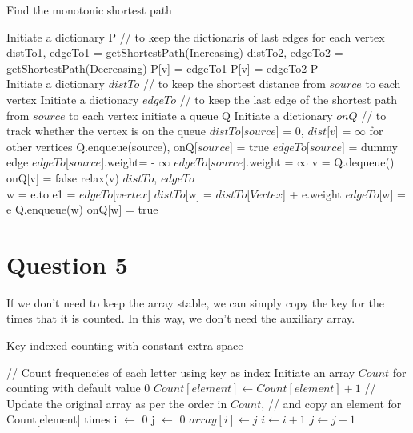\documentclass[11pt]{article}
\begin{document}
\begin{algorithm}
\caption{Find the monotonic shortest path}
\begin{algorithmic}[1]
\State Initiate a dictionary P 
\State // to keep the dictionaris of last edges for each vertex
\State distTo1, edgeTo1 = getShortestPath(Increasing)
\State distTo2, edgeTo2 = getShortestPath(Decreasing)
	\State P[v] = edgeTo1
\Else
	\State P[v] = edgeTo2
\EndIf
\EndFor
\Return P
\\
\State Initiate a dictionary $distTo$ 
\State // to keep the shortest distance from $source$ to each vertex
\State Initiate a dictionary $edgeTo$ 
\State // to keep the last edge of the shortest path from $source$ to each vertex
\State initiate a queue Q
\State Initiate a dictionary $onQ$ 
\State // to track whether the vertex is on the queue
\State $distTo$[$source$] = 0, $dist$[$v$] = $\infty$ for other vertices
\State Q.enqueue(source), onQ[$source$] = true
\State $edgeTo$[$source$] = dummy edge
	\State $edgeTo$[$source$].weight= - $\infty$
\Else
	\State $edgeTo$[$source$].weight = $\infty$
\EndIf
{}
	\State v = Q.dequeue()
	\State onQ[v] = false
	\State relax(v)
\EndWhile
\Return $distTo$, $edgeTo$
\\
	\State w = e.to
	\State e1 = $edgeTo$[$vertex$]
		\State $distTo$[w] = $distTo$[$Vertex$] + e.weight
		\State $edgeTo$[w] = e
			\State Q.enqueue(w)
			\State onQ[w] = true
		\EndIf
	\EndIf
	\EndIf
\EndFor
\EndProcedure

\EndProcedure
\EndProcedure
\end{algorithmic}
\end{algorithm}
\newpage
\section{Question 5}

If we don't need to keep the array stable, we can simply copy the key for the times that it is counted. In this way, we don't need the auxiliary array.
\begin{algorithm}
\caption{Key-indexed counting with constant extra space}
\begin{algorithmic}[1]
\State // Count frequencies of each letter using key as index
\State Initiate an array $Count$ for counting with default value 0
	\State $Count[element] \gets Count[element] + 1$ 
\EndFor
\State // Update the original array as per the order in $Count$,
\State // and copy an element for Count[element] times
\State i $\gets$ 0
\State j $\gets$ 0
		\State $array[i] \gets j$
		\State $i \gets i + 1$
	\EndFor
	\State $j \gets j + 1$
\EndWhile
\EndProcedure
\end{algorithmic}
\end{algorithm}
\end{document}
